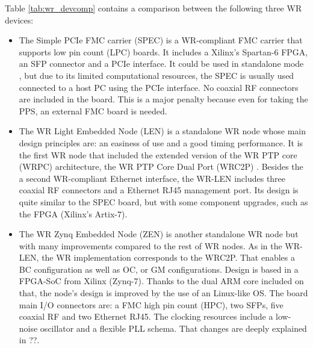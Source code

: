 Table \ref{tab:wr_devcomp} contains a comparison between the following three WR 
devices: 
\begin{itemize}
	\item The Simple PCIe FMC carrier (SPEC) \cite{ohwr:spec} is a WR-compliant 
	FMC carrier that supports low pin count (LPC) boards. It includes a 
	Xilinx's Spartan-6 FPGA, an SFP connector and a PCIe interface. It could be 
	used in standalone mode \cite{migueljl-paper-wr-spec}, but due to its 
	limited computational resources, the SPEC is usually used connected to a 
	host PC using the PCIe interface. 
	No coaxial RF connectors are included in the board. This is a major penalty 
	because even for taking the PPS, an external FMC board is needed.
	
	\item The WR Light Embedded Node (LEN) \cite{sevensols:wr_len} is a 
	standalone WR node whose main design principles are: an easiness of use and 
	a good timing performance. It is the first WR node that included the 
	extended version of the WR PTP core (WRPC) architecture, the WR PTP Core 
	Dual Port (WRC2P) \cite{torres2016scalability}. Besides the a second 
	WR-compliant 
	Ethernet interface, the WR-LEN includes three coaxial RF connectors and a 
	Ethernet RJ45 management port. Its design is quite similar to the SPEC 
	board, but with some component upgrades, such as the FPGA (Xilinx's 
	Artix-7).
	
	\item The WR Zynq Embedded Node (ZEN) \cite{sevensols:wr_zen} is another 
	standalone WR node but with many improvements compared to the rest of WR 
	nodes. As in the WR-LEN, the WR implementation corresponds to the WRC2P. 
	That enables a BC configuration as well as OC, or GM configurations. Design 
	is based in a FPGA-SoC from Xilinx (Zynq-7). Thanks to the dual ARM core 
	included on that, the node's design is improved by the use of an Linux-like 
	OS. The board main I/O connectors are: a FMC high pin count (HPC), two 
	SFPs, five coaxial RF and two Ethernet RJ45. The clocking resources include 
	a low-noise oscillator and a flexible PLL schema. That changes are deeply 
	explained in ??.
\end{itemize}

